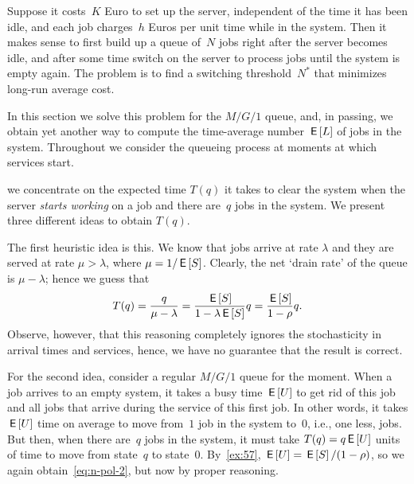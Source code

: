 \documentclass[queueing-book.tex]{subfiles}
\begin{document}
Suppose it costs~$K$ Euro to set up the server, independent of the time it has been idle, and each job charges~$h$ Euros per unit time while in the system.
Then it makes sense to first build up a queue of~$N$ jobs right after the server becomes idle,
and after some time switch on the server to process jobs until the system is empty again.
The problem is to find a switching threshold~$N^{*}$ that minimizes long-run average cost.


In this section we solve this problem for the $M/G/1$ queue, and, in passing, we obtain yet another way to compute the time-average number $\,\mathsf{E}\left[L\right]$ of jobs in the system.
Throughout we consider the queueing process at moments at which services start.


 we concentrate on the expected time $T(q)$ it takes to clear the system when the server \emph{starts working} on a job and there are~$q$ jobs in the system. We present three different ideas to obtain $T(q)$.

The first heuristic idea is this. We know that jobs arrive at rate $\lambda$ and they are served at rate $\mu>\lambda$, where $\mu = 1/ \,\mathsf{E}\left[S\right]$.
Clearly, the net `drain rate' of the queue is $\mu-\lambda$; hence we guess that
\begin{equation}\label{eq:n-pol-2}
T(q)= \frac{q}{\mu-\lambda} = \frac{\,\mathsf{E}\left[S\right] }{1-\lambda \,\mathsf{E}\left[S\right]} q = \frac{\,\mathsf{E}\left[S\right]}{1-\rho}q.
\end{equation}
Observe, however, that this reasoning completely ignores the stochasticity in arrival times and services, hence, we have no guarantee that the result is correct.


For the second idea, consider a regular $M/G/1$ queue for the moment.
When a job arrives to an empty system, it takes a busy time $\,\mathsf{E}\left[U\right]$ to get rid of this job and all jobs that arrive during the service of this first job.
In other words, it takes $\,\mathsf{E}\left[U\right]$ time on average to move from~$1$ job in the system to~$0$, i.e., one less, jobs.
But then, when there are~$q$ jobs in the system, it must take $T(q) = q\,\mathsf{E}\left[U\right]$ units of time to move from state~$q$ to state~$0$.
By~\cref{ex:57}, $\,\mathsf{E}\left[U\right]=\,\mathsf{E}\left[S\right]/(1-\rho)$, so we again obtain~\cref{eq:n-pol-2}, but now by proper reasoning.
\end{document}
